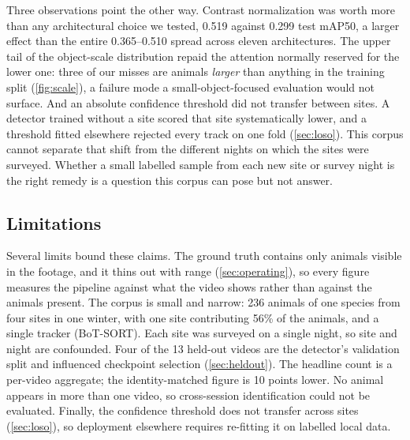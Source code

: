Three observations point the other way. Contrast normalization was worth more than any
architectural choice we tested, 0.519 against 0.299 test mAP50, a larger effect than the
entire 0.365--0.510 spread across eleven architectures. The upper tail of the object-scale
distribution repaid the attention normally reserved for the lower one: three of our misses
are animals \emph{larger} than anything in the training split (\cref{fig:scale}), a failure
mode a small-object-focused evaluation would not surface. And an absolute confidence
threshold did not transfer between sites. A detector trained without a site scored that site
systematically lower, and a threshold fitted elsewhere rejected every track on one fold
(\cref{sec:loso}). This corpus cannot separate that shift from the different nights on
which the sites were surveyed. Whether a small labelled sample from each new site or survey
night is the right remedy is a question this corpus can pose but not answer.

\subsection{Limitations}
\label{sec:limitations}

Several limits bound these claims. The ground truth contains only animals visible in the
footage, and it thins out with range (\cref{sec:operating}), so every figure measures the
pipeline against what the video shows rather than against the animals present. The corpus is
small and narrow: 236 animals of one species from four sites in one winter, with one site
contributing 56\% of the animals, and a single tracker (BoT-SORT). Each site was surveyed on
a single night, so site and night are confounded. Four of the 13 held-out videos are the
detector's validation split and influenced checkpoint selection (\cref{sec:heldout}). The
headline count is a per-video aggregate; the identity-matched figure is 10 points lower. No
animal appears in more than one video, so cross-session identification could not be
evaluated. Finally, the confidence threshold does not transfer across sites
(\cref{sec:loso}), so deployment elsewhere requires re-fitting it on labelled local data.

